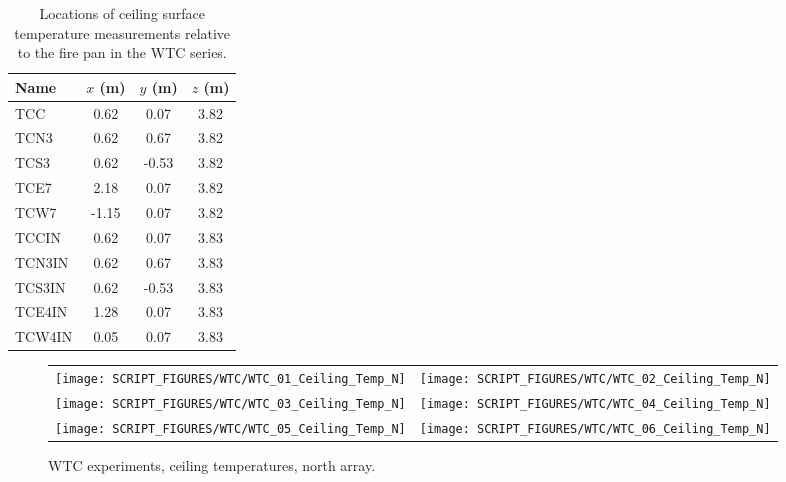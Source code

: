 \begin{table}[h!]
\caption[Ceiling surface measurement locations for the WTC series]{Locations of ceiling surface temperature measurements relative to the fire pan in the WTC series.}
\begin{center}
\begin{tabular}{|l|c|c|c|}
\hline
Name                & $x$ (m)   & $y$ (m)   & $z$ (m)   \\ \hline \hline
TCC                 & 0.62      & 0.07      & 3.82      \\ \hline
TCN3                & 0.62      & 0.67      & 3.82      \\ \hline
TCS3                & 0.62      & -0.53     & 3.82      \\ \hline
TCE7                & 2.18      & 0.07      & 3.82      \\ \hline
TCW7                & -1.15     & 0.07      & 3.82      \\ \hline \hline
TCCIN               & 0.62      & 0.07      & 3.83      \\ \hline
TCN3IN              & 0.62      & 0.67      & 3.83      \\ \hline
TCS3IN              & 0.62      & -0.53     & 3.83      \\ \hline
TCE4IN              & 1.28      & 0.07      & 3.83      \\ \hline
TCW4IN              & 0.05      & 0.07      & 3.83      \\ \hline
\end{tabular}
\end{center}
\label{WTC_Ceiling}
\end{table}

\newpage

\begin{figure}[p]
\begin{tabular*}{\textwidth}{l@{\extracolsep{\fill}}r}
\texttt{[image: SCRIPT\_FIGURES/WTC/WTC\_01\_Ceiling\_Temp\_N]} &
\texttt{[image: SCRIPT\_FIGURES/WTC/WTC\_02\_Ceiling\_Temp\_N]} \\
\texttt{[image: SCRIPT\_FIGURES/WTC/WTC\_03\_Ceiling\_Temp\_N]} &
\texttt{[image: SCRIPT\_FIGURES/WTC/WTC\_04\_Ceiling\_Temp\_N]} \\
\texttt{[image: SCRIPT\_FIGURES/WTC/WTC\_05\_Ceiling\_Temp\_N]} &
\texttt{[image: SCRIPT\_FIGURES/WTC/WTC\_06\_Ceiling\_Temp\_N]}
\end{tabular*}
\caption{WTC experiments, ceiling temperatures, north array.}
\label{NIST_WTC_Ceiling_N}
\end{figure}


